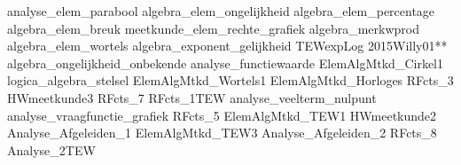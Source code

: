 analyse_elem_parabool
algebra_elem_ongelijkheid
algebra_elem_percentage
algebra_elem_breuk
meetkunde_elem_rechte_grafiek
algebra_merkwprod
algebra_elem_wortels
algebra_exponent_gelijkheid
TEWexpLog
2015Willy01**
algebra_ongelijkheid_onbekende
analyse_functiewaarde
ElemAlgMtkd_Cirkel1
logica_algebra_stelsel
ElemAlgMtkd_Wortels1
ElemAlgMtkd_Horloges
RFcts_3
HWmeetkunde3
RFcts_7
RFcts_1TEW
analyse_veelterm_nulpunt
analyse_vraagfunctie_grafiek
RFcts_5
ElemAlgMtkd_TEW1
HWmeetkunde2
Analyse_Afgeleiden_1
ElemAlgMtkd_TEW3
Analyse_Afgeleiden_2
RFcts_8
Analyse_2TEW
